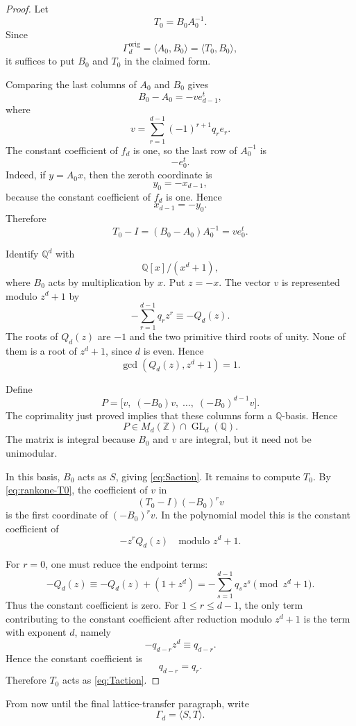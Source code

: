 \documentclass[a4paper,11pt]{amsart}
\newcommand{\Z}{\mathbb Z}
\newcommand{\Q}{\mathbb Q}
\newcommand{\GL}{\operatorname{GL}}
\theoremstyle{remark}
\numberwithin{equation}{section}
\begin{document}
\begin{proof}
Let
\[
T_0=B_0A_0^{-1}.
\]
Since
\[
\Gamma_d^{\mathrm{orig}}=\langle A_0,B_0\rangle
=\langle T_0,B_0\rangle,
\]
it suffices to put \(B_0\) and \(T_0\) in the claimed form.

Comparing the last columns of \(A_0\) and \(B_0\) gives
\[
B_0-A_0=-ve_{d-1}^{t},
\]
where
\[
v=\sum_{r=1}^{d-1}(-1)^{r+1}q_re_r.
\]
The constant coefficient of \(f_d\) is one, so the last row of \(A_0^{-1}\) is
\[
-e_0^t.
\]
Indeed, if \(y=A_0x\), then the zeroth coordinate is
\[
y_0=-x_{d-1},
\]
because the constant coefficient of \(f_d\) is one. Hence
\[
x_{d-1}=-y_0.
\]
Therefore
\begin{equation}\label{eq:rankone-T0}
T_0-I=(B_0-A_0)A_0^{-1}=ve_0^t.
\end{equation}

Identify \(\Q^d\) with
\[
\Q[x]/(x^d+1),
\]
where \(B_0\) acts by multiplication by \(x\). Put \(z=-x\). The vector \(v\) is represented modulo \(z^d+1\) by
\[
-\sum_{r=1}^{d-1}q_rz^r
\equiv
-Q_d(z).
\]
The roots of \(Q_d(z)\) are \(-1\) and the two primitive third roots of unity. None of them is a root of \(z^d+1\), since \(d\) is even. Hence
\[
\gcd(Q_d(z),z^d+1)=1.
\]

Define
\[
P=
\bigl[
v,\;(-B_0)v,\;\ldots,\;(-B_0)^{d-1}v
\bigr].
\]
The coprimality just proved implies that these columns form a \(\Q\)-basis. Hence
\[
P\in M_d(\Z)\cap\GL_d(\Q).
\]
The matrix is integral because \(B_0\) and \(v\) are integral, but it need not be unimodular.

In this basis, \(B_0\) acts as \(S\), giving \eqref{eq:Saction}. It remains to compute \(T_0\). By \eqref{eq:rankone-T0}, the coefficient of \(v\) in
\[
(T_0-I)(-B_0)^rv
\]
is the first coordinate of \((-B_0)^rv\). In the polynomial model this is the constant coefficient of
\[
-z^rQ_d(z)
\quad\text{modulo } z^d+1.
\]

For \(r=0\), one must reduce the endpoint terms:
\[
-Q_d(z)
\equiv
-Q_d(z)+(1+z^d)
=
-\sum_{s=1}^{d-1}q_sz^s
\pmod{z^d+1}.
\]
Thus the constant coefficient is zero. For \(1\leq r\leq d-1\), the only term contributing to the constant coefficient after reduction modulo \(z^d+1\) is the term with exponent \(d\), namely
\[
-q_{d-r}z^d\equiv q_{d-r}.
\]
Hence the constant coefficient is
\[
q_{d-r}=q_r.
\]
Therefore \(T_0\) acts as \eqref{eq:Taction}.
\end{proof}

From now until the final lattice-transfer paragraph, write
\[
\Gamma_d=\langle S,T\rangle.
\]
\end{document}
